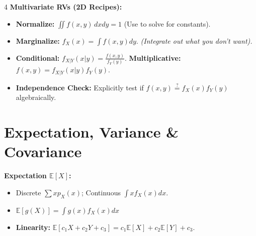 \documentclass[9pt]{extarticle}
\begin{document}
\begin{multicols*}{4}
\textbf{Multivariate RVs (2D Recipes):}
\begin{itemize}
    \item \textbf{Normalize:} $\iint f(x,y)\,dxdy = 1$ (Use to solve for constants).
    \item \textbf{Marginalize:} $f_X(x) = \int f(x,y)dy$. \textit{(Integrate out what you don't want).}
    \item \textbf{Conditional:} $f_{X|Y}(x|y) = \frac{f(x,y)}{f_Y(y)}$. \quad \textbf{Multiplicative:} $f(x,y) = f_{X|Y}(x|y)f_Y(y)$.
    \item \textbf{Independence Check:} Explicitly test if $f(x,y) \stackrel{?}{=} f_X(x)f_Y(y)$ algebraically.
\end{itemize}

\section*{Expectation, Variance \& Covariance}
\textbf{Expectation $\mathbb{E}[X]$:}
\begin{itemize}
    \item Discrete $\sum x p_X(x)$; Continuous $\int x f_X(x)dx$.
    \item $\mathbb{E}[g(X)] = \int g(x)f_X(x)dx$
    \item \textbf{Linearity:} $\mathbb{E}[c_1X + c_2Y + c_3] = c_1\mathbb{E}[X] + c_2\mathbb{E}[Y] + c_3$.
\end{itemize}


\end{multicols*}
\end{document}
